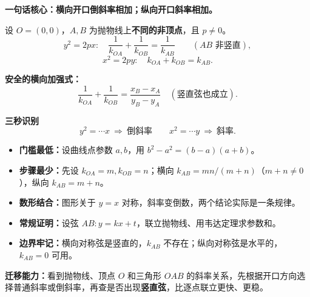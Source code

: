 \clearpage
\begin{summarybox}
\textbf{\textcolor{CSummary}{一句话核心：横向开口倒斜率相加；纵向开口斜率相加。}}

设 $O=(0,0)$，$A,B$ 为抛物线上\textbf{不同的非顶点}，且 $p\ne0$。
\[
\boxed{y^2=2px:\quad
\frac1{k_{OA}}+\frac1{k_{OB}}=\frac1{k_{AB}}}
\qquad(AB\text{ 非竖直}),
\]
\[
\boxed{x^2=2py:\quad
k_{OA}+k_{OB}=k_{AB}}.
\]

\textbf{安全的横向加强式：}
\[
\boxed{\frac1{k_{OA}}+\frac1{k_{OB}}=
\frac{x_B-x_A}{y_B-y_A}}
\quad(\text{竖直弦也成立}).
\]

\medskip
\textbf{\textcolor{CSummary}{三秒识别}}
\[
\boxed{y^2=\cdots x\ \Rightarrow\ \text{倒斜率}}
\qquad
\boxed{x^2=\cdots y\ \Rightarrow\ \text{斜率}}.
\]

\begin{itemize}[leftmargin=*,itemsep=0.4em]
\item \textbf{门槛最低：}设曲线点参数 $a,b$，用 $b^2-a^2=(b-a)(a+b)$。
\item \textbf{步骤最少：}先设 $k_{OA}=m,k_{OB}=n$；横向 $k_{AB}=mn/(m+n)$（$m+n\ne0$），纵向 $k_{AB}=m+n$。
\item \textbf{数形结合：}图形关于 $y=x$ 对称，斜率变倒数，两个结论实际是一条规律。
\item \textbf{常规证明：}设弦 $AB:y=kx+t$，联立抛物线、用韦达定理求参数和。
\item \textbf{边界牢记：}横向对称弦是竖直的，$k_{AB}$ 不存在；纵向对称弦是水平的，$k_{AB}=0$ 可用。
\end{itemize}

\medskip
\textbf{\textcolor{CSummary}{迁移能力：}}看到抛物线、顶点 $O$ 和三角形 $OAB$ 的斜率关系，先根据开口方向选择普通斜率或倒斜率，再查是否出现\textbf{竖直弦}，比逐点联立更快、更稳。
\end{summarybox}

